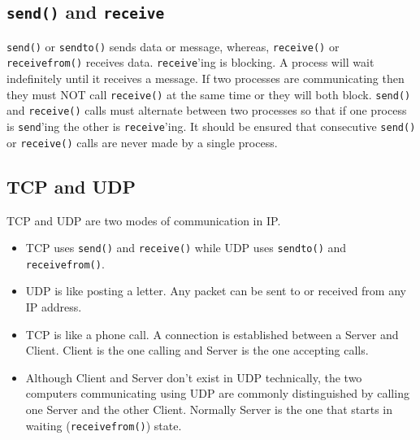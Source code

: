 \documentclass[12pt,a4paper]{article}
\begin{document}
\subsection{\texttt{send()} and \texttt{receive}}
\verb|send()| or \verb|sendto()| sends data or message, whereas, \verb|receive()| or \verb|receivefrom()| receives data. \verb|receive|'ing is blocking. A process will wait indefinitely until it receives a message. If two processes are communicating then they must NOT call \verb|receive()| at the same time or they will both block. \verb|send()| and \verb|receive()| calls must alternate between two processes so that if one process is \verb|send|'ing the other is \verb|receive|'ing. It should be ensured that consecutive \verb|send()| or \verb|receive()| calls are never made by a single process.
\subsection{TCP and UDP}
TCP and UDP are two modes of communication in IP.
\begin{itemize}
\item TCP uses \verb|send()| and \verb|receive()| while UDP uses \verb|sendto()| and \verb|receivefrom()|.
\item UDP is like posting a letter. Any packet can be sent to or received from any IP address. 
\item TCP is like a phone call. A connection is established between a Server and Client. Client is the one calling and Server is the one accepting calls.
\item Although Client and Server don't exist in UDP technically, the two computers communicating using UDP are commonly distinguished by calling one Server and the other Client. Normally Server is the one that starts in waiting (\verb|receivefrom()|) state.
\end{itemize}


\end{document}
